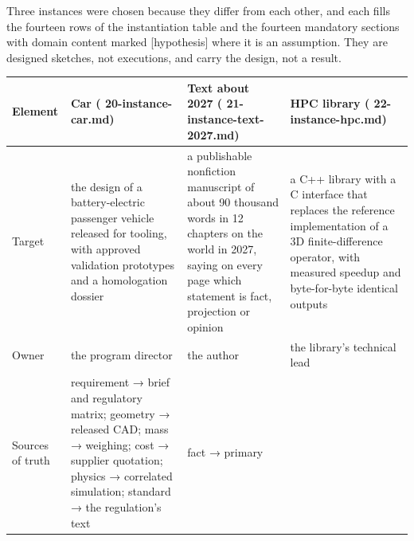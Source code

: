\documentclass[
  american,
  10pt,
]{report}
\newcounter{none} %
\renewcommand{\texttt}[1]{{\ttfamily\hyphenchar\font=-1 #1}}
\begin{document}
Three instances were chosen because they differ from each other, and
each fills the fourteen rows of the instantiation table and the fourteen
mandatory sections with domain content marked \texttt{[hypothesis]}
where it is an assumption. They are designed sketches, not executions,
and carry the design, not a result.

{\def\LTcaptype{none} %
\begin{longtable}[]{@{}
  >{\raggedright\arraybackslash}p{}
  >{\raggedright\arraybackslash}p{}
  >{\raggedright\arraybackslash}p{}
  >{\raggedright\arraybackslash}p{}@{}}
\toprule\noalign{}
\begin{minipage}[b]{\linewidth}\raggedright
Element
\end{minipage} & \begin{minipage}[b]{\linewidth}\raggedright
Car (\texttt{20-\allowbreak{}instance-\allowbreak{}car.\allowbreak{}md})
\end{minipage} & \begin{minipage}[b]{\linewidth}\raggedright
Text about 2027
(\texttt{21-\allowbreak{}instance-\allowbreak{}text-\allowbreak{}2027.\allowbreak{}md})
\end{minipage} & \begin{minipage}[b]{\linewidth}\raggedright
HPC library
(\texttt{22-\allowbreak{}instance-\allowbreak{}hpc.\allowbreak{}md})
\end{minipage} \\
\midrule\noalign{}
\endhead
\bottomrule\noalign{}
\endlastfoot
Target & the design of a battery-electric passenger vehicle released for
tooling, with approved validation prototypes and a homologation dossier
& a publishable nonfiction manuscript of about 90 thousand words in 12
chapters on the world in 2027, saying on every page which statement is
fact, projection or opinion & a C++ library with a C interface that
replaces the reference implementation of a 3D finite-difference
operator, with measured speedup and byte-for-byte identical outputs \\
Owner & the program director & the author & the library's technical
lead \\
Sources of truth & requirement → brief and regulatory matrix; geometry →
released CAD; mass → weighing; cost → supplier quotation; physics →
correlated simulation; standard → the regulation's text & fact → primary

\end{longtable}}
\end{document}
